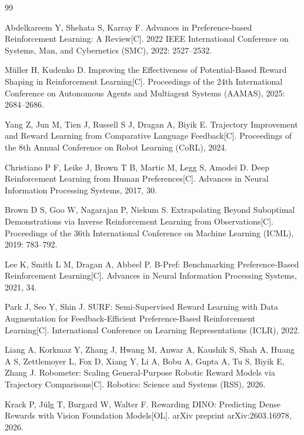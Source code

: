 \clearpage
\begin{thebibliography}{99}

    Abdelkareem Y, Shehata S, Karray F.
    Advances in Preference-based Reinforcement Learning: A Review[C].
    2022 IEEE International Conference on Systems, Man, and Cybernetics (SMC), 2022: 2527--2532.
    
    Müller H, Kudenko D.
    Improving the Effectiveness of Potential-Based Reward Shaping in Reinforcement Learning[C].
    Proceedings of the 24th International Conference on Autonomous Agents and Multiagent Systems (AAMAS), 2025: 2684--2686.
    
    Yang Z, Jun M, Tien J, Russell S J, Dragan A, Biyik E.
    Trajectory Improvement and Reward Learning from Comparative Language Feedback[C].
    Proceedings of the 8th Annual Conference on Robot Learning (CoRL), 2024.
    
    Christiano P F, Leike J, Brown T B, Martic M, Legg S, Amodei D.
    Deep Reinforcement Learning from Human Preferences[C].
    Advances in Neural Information Processing Systems, 2017, 30.
    
    Brown D S, Goo W, Nagarajan P, Niekum S.
    Extrapolating Beyond Suboptimal Demonstrations via Inverse Reinforcement Learning from Observations[C].
    Proceedings of the 36th International Conference on Machine Learning (ICML), 2019: 783--792.
    
    Lee K, Smith L M, Dragan A, Abbeel P.
    B-Pref: Benchmarking Preference-Based Reinforcement Learning[C].
    Advances in Neural Information Processing Systems, 2021, 34.
    
    Park J, Seo Y, Shin J.
    SURF: Semi-Supervised Reward Learning with Data Augmentation for Feedback-Efficient Preference-Based Reinforcement Learning[C].
    International Conference on Learning Representations (ICLR), 2022.
    
    Liang A, Korkmaz Y, Zhang J, Hwang M, Anwar A, Kaushik S, Shah A, Huang A S, Zettlemoyer L, Fox D, Xiang Y, Li A, Bobu A, Gupta A, Tu S, Biyik E, Zhang J.
    Robometer: Scaling General-Purpose Robotic Reward Models via Trajectory Comparisons[C].
    Robotics: Science and Systems (RSS), 2026.
    
    Krack P, Jülg T, Burgard W, Walter F.
    Rewarding DINO: Predicting Dense Rewards with Vision Foundation Models[OL].
    arXiv preprint arXiv:2603.16978, 2026.
    

\end{thebibliography}
